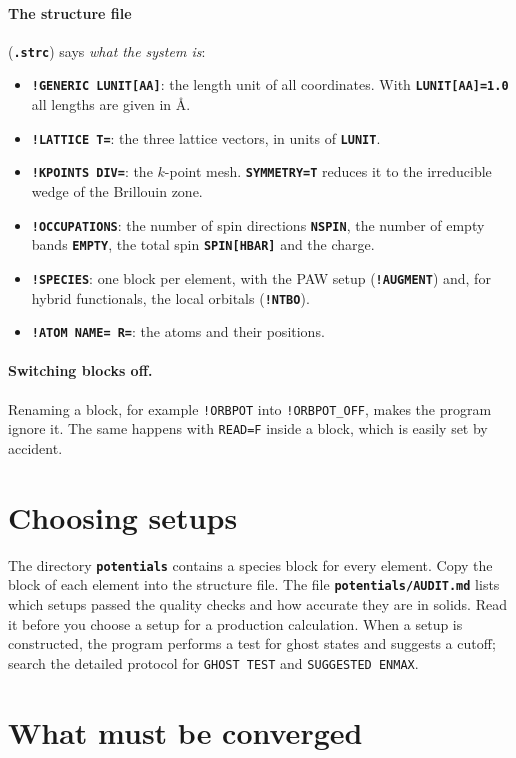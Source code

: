 \documentclass[11pt,a4paper,oneside]{book}
\newcommand{\key}[1]{\textbf{\texttt{#1}}}
\newcommand{\file}[1]{\textbf{\texttt{#1}}}
\begin{document}
\paragraph{The structure file} (\file{.strc}) says \emph{what the system
is}:
\begin{itemize}
\item \key{!GENERIC LUNIT[AA]}: the length unit of all coordinates.
  With \key{LUNIT[AA]=1.0} all lengths are given in \AA.
\item \key{!LATTICE T=}: the three lattice vectors, in units of
  \key{LUNIT}.
\item \key{!KPOINTS DIV=}: the $k$-point mesh. \key{SYMMETRY=T} reduces
  it to the irreducible wedge of the Brillouin zone.
\item \key{!OCCUPATIONS}: the number of spin directions \key{NSPIN},
  the number of empty bands \key{EMPTY}, the total spin \key{SPIN[HBAR]}
  and the charge.
\item \key{!SPECIES}: one block per element, with the PAW setup
  (\key{!AUGMENT}) and, for hybrid functionals, the local orbitals
  (\key{!NTBO}).
\item \key{!ATOM NAME= R=}: the atoms and their positions.
\end{itemize}

\paragraph{Switching blocks off.} Renaming a block, for example
\texttt{!ORBPOT} into \texttt{!ORBPOT\_OFF}, makes the program ignore
it. The same happens with \texttt{READ=F} inside a block, which is easily
set by accident.

\section{Choosing setups}

The directory \file{potentials} contains a species block for every
element. Copy the block of each element into the structure file. The
file \file{potentials/AUDIT.md} lists which setups passed the quality
checks and how accurate they are in solids. Read it before you choose a
setup for a production calculation. When a setup is constructed, the
program performs a test for ghost states and suggests a cutoff; search
the detailed protocol for \texttt{GHOST TEST} and
\texttt{SUGGESTED ENMAX}.

\section{What must be converged}
\end{document}
